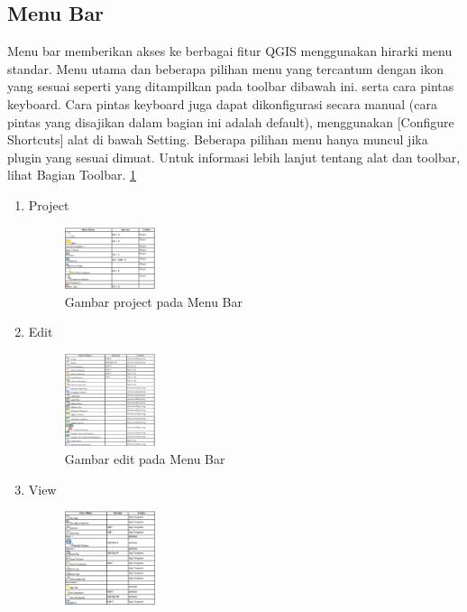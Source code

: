 \subsection{Menu Bar}
Menu bar memberikan akses ke berbagai fitur QGIS menggunakan hirarki menu standar. Menu utama dan beberapa pilihan menu yang tercantum dengan ikon yang sesuai seperti yang ditampilkan pada toolbar dibawah ini. serta cara pintas keyboard. Cara pintas keyboard juga dapat dikonfigurasi secara manual (cara pintas yang disajikan dalam bagian ini adalah default), menggunakan [Configure Shortcuts] alat di bawah Setting. Beberapa pilihan menu hanya muncul jika plugin yang sesuai dimuat. Untuk informasi lebih lanjut tentang alat dan toolbar, lihat Bagian Toolbar. \ref{qgis:menubar}
\begin{enumerate}
\item
Project
\begin{figure}[ht]
    \centerline{\includegraphics[width=0.25\textwidth]{figures/menubar}}
    \caption{Gambar project pada Menu Bar}
    \label{qgis:menubar}
    \end{figure}
\item
Edit
\begin{figure}[ht]
    \centerline{\includegraphics[width=0.25\textwidth]{figures/menubar1}}
    \caption{Gambar edit pada Menu Bar}
    \label{qgis:menubar1}
    \end{figure}
\item
View
\begin{figure}[ht]
    \centerline{\includegraphics[width=0.25\textwidth]{figures/menubar2}}

\end{figure}
\end{enumerate}
